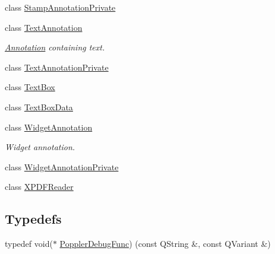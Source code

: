 \begin{DoxyCompactItemize}
class \hyperlink{class_poppler_1_1_stamp_annotation_private}{Stamp\+Annotation\+Private}
\item 
class \hyperlink{class_poppler_1_1_text_annotation}{Text\+Annotation}
\begin{DoxyCompactList}\small\item\em \hyperlink{class_poppler_1_1_annotation}{Annotation} containing text. \end{DoxyCompactList}\item 
class \hyperlink{class_poppler_1_1_text_annotation_private}{Text\+Annotation\+Private}
\item 
class \hyperlink{class_poppler_1_1_text_box}{Text\+Box}
\item 
class \hyperlink{class_poppler_1_1_text_box_data}{Text\+Box\+Data}
\item 
class \hyperlink{class_poppler_1_1_widget_annotation}{Widget\+Annotation}
\begin{DoxyCompactList}\small\item\em Widget annotation. \end{DoxyCompactList}\item 
class \hyperlink{class_poppler_1_1_widget_annotation_private}{Widget\+Annotation\+Private}
\item 
class \hyperlink{class_poppler_1_1_x_p_d_f_reader}{X\+P\+D\+F\+Reader}
\end{DoxyCompactItemize}
\subsection*{Typedefs}
\begin{DoxyCompactItemize}
\item 
typedef void($\ast$ \hyperlink{namespace_poppler_a6743a660a5959ea508737ff913e3bd56}{Poppler\+Debug\+Func}) (const Q\+String \&, const Q\+Variant \&)
\end{DoxyCompactItemize}
